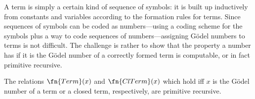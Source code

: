 \documentclass[../../../include/open-logic-section]{subfiles}
\begin{document}

\begin{explain}
A term is simply a certain kind of sequence of symbols: it is built up
inductively from constants and variables according to the formation
rules for terms.  Since sequences of symbols can be coded as
numbers---using a coding scheme for the symbols plus a way to code
sequences of numbers---assigning G\"odel numbers to terms is not
difficult.  The challenge is rather to show that the property a number
has if it is the G\"odel number of a correctly formed term is
computable, or in fact primitive recursive.
\end{explain}

\begin{prop}
The relations $\fn{Term}(x)$ and $\fn{ClTerm}(x)$ which hold iff $x$
is the G\"odel number of a term or a closed term, respectively, are
primitive recursive.
\end{prop}
\end{document}

